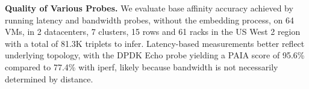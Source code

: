\noindent\textbf{Quality of Various \marcopolo{} Probes.}
We evaluate base affinity accuracy achieved by running latency and bandwidth probes, without the embedding process, on 64 VMs, in 2 datacenters, 7 clusters, 15 rows and 61 racks in the US West 2 region with a total of 81.3K triplets to infer. Latency-based measurements better reflect underlying topology, with the DPDK Echo probe yielding a PAIA score of 95.6\% compared to 77.4\% with iperf, likely because bandwidth is not necessarily determined by distance. %







